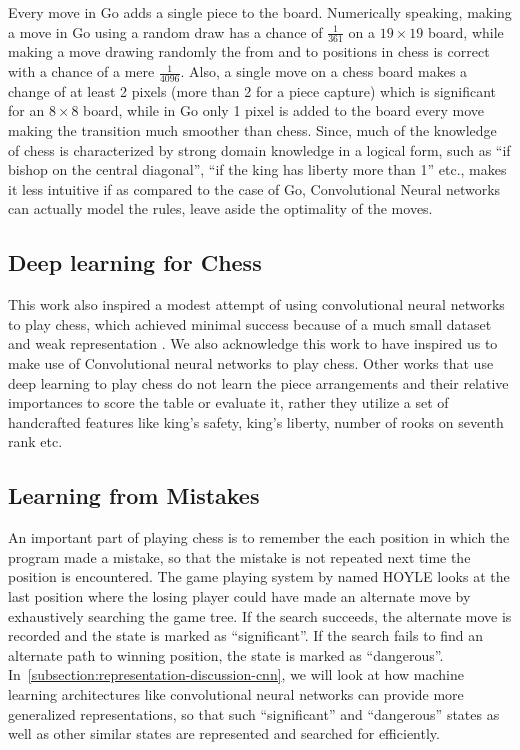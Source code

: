 Every move in Go adds a single piece to the board. 
Numerically speaking, making a move in Go using a random draw has a chance of 
$\frac{1}{361}$ on a $19\times 19$ board, while making a move drawing 
randomly the from and to positions in chess is correct with a 
chance of a mere $\frac{1}{4096}$. Also, a single move on a chess board makes a 
change of at least 2 pixels (more than 2 for a piece capture) which is 
significant for an $8\times 8$ board, while in Go only 1 pixel is added to the 
board every move making the transition much smoother than chess. Since, much 
of the knowledge of chess is characterized by strong domain knowledge in a 
logical form, such as ``if bishop on the central diagonal'', ``if the king has 
liberty more than 1'' etc., makes it less intuitive if as compared to the case 
of Go, Convolutional Neural networks can actually model the rules, leave 
aside the optimality of the moves.\\

\subsection{Deep learning for Chess}
This work also inspired a modest attempt of using convolutional neural networks 
to play chess, which achieved minimal success because of a much small dataset 
and weak representation \cite{oshripredicting}. We also acknowledge this work 
to have inspired us to make use of Convolutional neural networks to play chess. 
Other works that use deep learning to play chess do not learn the piece 
arrangements and their relative importances to score the table or evaluate it, 
rather they utilize a set of handcrafted features like king's safety, king's 
liberty, number of rooks on seventh rank etc. \cite{mannen2003learning, 
thrun1995learning} 

\subsection{Learning from Mistakes}
\label{subsection:mistakes-learn}
An important part of playing chess is to remember the each position in which 
the program made a mistake, so that the mistake is not repeated next time the 
position is encountered. The game playing system 
by \citet{epstein-01_learning-to-play-expertly-tutorial-on-hoyle} named HOYLE 
looks at the last position where the losing player could have made an alternate 
move by exhaustively searching the game tree. If the search succeeds, the 
alternate move is recorded and the state is marked as ``significant''. If the 
search fails to find an alternate path to winning position, the state is marked 
as ``dangerous''. In~\ref{subsection:representation-discussion-cnn}, we will 
look at how machine learning architectures like convolutional neural networks 
can provide more generalized representations, so that such ``significant'' and 
``dangerous'' states as well as other similar states are represented and 
searched for efficiently.

